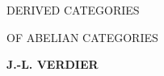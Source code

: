 \clearpage
\begingroup
  \thispagestyle{empty}
  \centering
  \vspace*{0.24\textheight}
  {\Huge DERIVED CATEGORIES\par}
  \vspace{1.6em}
  {\Huge OF ABELIAN CATEGORIES\par}
  \vspace{7em}
  {\Large\bfseries J.-L. VERDIER\par}
  \vfill
\par
\endgroup
\clearpage
\setcounter{page}{1}
